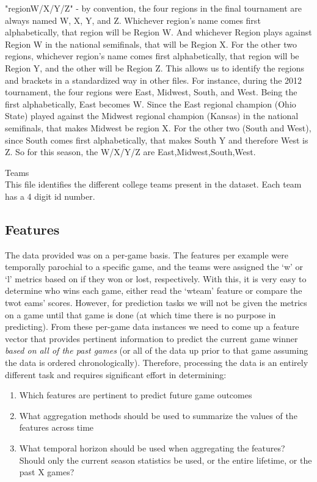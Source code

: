 \documentclass{article} %
\begin{document}
"regionW/X/Y/Z" - by convention, the four regions in the final tournament are always named W, X, Y, and Z. Whichever region's name comes first alphabetically, that region will be Region W. And whichever Region plays against Region W in the national semifinals, that will be Region X. For the other two regions, whichever region's name comes first alphabetically, that region will be Region Y, and the other will be Region Z. This allows us to identify the regions and brackets in a standardized way in other files. For instance, during the 2012 tournament, the four regions were East, Midwest, South, and West. Being the first alphabetically, East becomes W. Since the East regional champion (Ohio State) played against the Midwest regional champion (Kansas) in the national semifinals, that makes Midwest be region X. For the other two (South and West), since South comes first alphabetically, that makes South Y and therefore West is Z. So for this season, the W/X/Y/Z are East,Midwest,South,West.



Teams\\
This file identifies the different college teams present in the dataset. Each team has a 4 digit id number.


\subsection{Features}
\label{sec:data-features}

The data provided was on a per-game basis.
The features per example were temporally parochial to a specific game, and the teams were assigned the `w' or `l' metrics based on if they won or lost, respectively.
With this, it is very easy to determine who wins each game, either read the `wteam' feature or compare the twot eams' scores.
However, for prediction tasks we will not be given the metrics on a game until that game is done (at which time there is no purpose in predicting).
From these per-game data instances we need to come up a feature vector that provides pertinent information to predict the current game winner \textit{based on all of the past games} (or all of the data up prior to that game assuming the data is ordered chronologically).
Therefore, processing the data is an entirely different task and requires significant effort in determining:

\begin{enumerate}
  \item \label{itm:features-pertinent} Which features are pertinent to predict future game outcomes
  \item \label{itm:features-aggregate} What aggregation methods should be used to summarize the values of the features across time
  \item \label{itm:features-horizon} What temporal horizon should be used when aggregating the features?  Should only the current season statistics be used, or the entire lifetime, or the past X games?
\end{enumerate}
\end{document}
